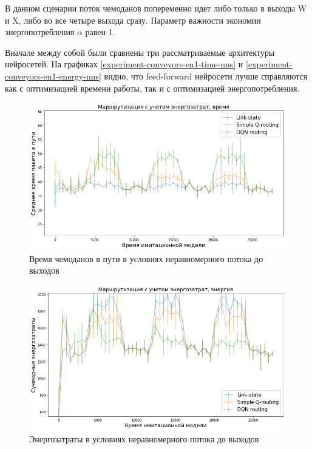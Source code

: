 \documentclass[specification, annotation]{itmo-student-thesis}
\begin{document}
В данном сценарии поток чемоданов попеременно идет либо только в выходы W и X,
либо во все четыре выхода сразу. Параметр важности экономии энергопотребления
$\alpha$ равен 1.

Вначале между собой были сравнены три рассматриваемые архитектуры нейросетей. На
графиках \ref{experiment-conveyors-en1-time-nns} и
\ref{experiment-conveyors-en1-energy-nns} видно, что feed-forward нейросети
лучше справляются как с оптимизацией времени работы, так и с оптимизацией
энергопотребления.

\begin{figure}[!h]
  \caption{Время чемоданов в пути в условиях неравномерного потока до
    выходов}\label{experiment-conveyors-en1-time}
  \centering
  \includegraphics[scale=0.6]{experiment-conveyors-en1-time}
\end{figure}

\begin{figure}[!h]
  \caption{Энергозатраты в условиях неравномерного потока до
    выходов}\label{experiment-conveyors-en1-energy}
  \centering
  \includegraphics[scale=0.6]{experiment-conveyors-en1-energy}
\end{figure}
\end{document}
